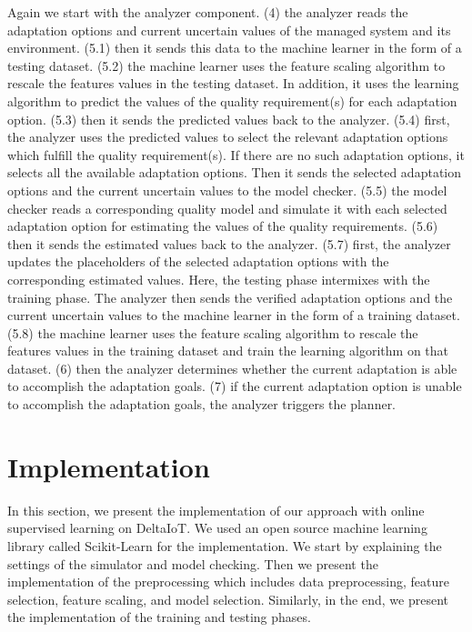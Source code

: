 \documentclass[a4paper,12pt]{article}
\begin{document}
Again we start with the analyzer component. (4) the analyzer reads the adaptation options and current uncertain values of the managed system and its environment. (5.1) then it sends this data to the machine learner in the form of a testing dataset. (5.2) the machine learner uses the feature scaling algorithm to rescale the features values in the testing dataset. In addition, it uses the learning algorithm to predict the values of the quality requirement(s) for each adaptation option. (5.3) then it sends the predicted values back to the analyzer. (5.4) first, the analyzer uses the predicted values to select the relevant adaptation options which fulfill the quality requirement(s). If there are no such adaptation options, it selects all the available adaptation options. Then it sends the selected adaptation options and the current uncertain values to the model checker. (5.5) the model checker reads a corresponding quality model and simulate it with each selected adaptation option for estimating the values of the quality requirements. (5.6) then it sends the estimated values back to the analyzer. (5.7) first, the analyzer updates the placeholders of the selected adaptation options with the corresponding estimated values. Here, the testing phase intermixes with the training phase. The analyzer then sends the verified adaptation options and the current uncertain values to the machine learner in the form of a training dataset. (5.8) the machine learner uses the feature scaling algorithm to rescale the features values in the training dataset and train the learning algorithm on that dataset. (6) then the analyzer determines whether the current adaptation is able to accomplish the adaptation goals. (7) if the current adaptation option is unable to accomplish the adaptation goals, the analyzer triggers the planner.
\newpage
\section{Implementation} \label{Implementation}
In this section, we present the implementation of our approach with online supervised learning on DeltaIoT. We used an open source machine learning library called Scikit-Learn \cite{SLMLIP-2011} for the implementation. We start by explaining the settings of the simulator and model checking. Then we present the implementation of the preprocessing which includes data preprocessing, feature selection, feature scaling, and model selection. Similarly, in the end, we present the implementation of the training and testing phases.
\end{document}
